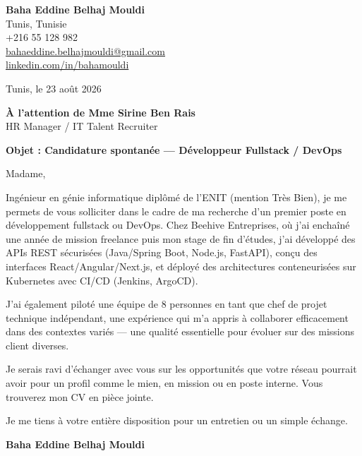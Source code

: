 \documentclass[a4paper,11pt]{article}
\begin{document}
\begin{flushright}
{\bfseries Baha Eddine Belhaj Mouldi}\\
Tunis, Tunisie\\
+216 55 128 982\\
\href{mailto:bahaeddine.belhajmouldi@gmail.com}{bahaeddine.belhajmouldi@gmail.com}\\
\href{https://linkedin.com/in/bahamouldi}{linkedin.com/in/bahamouldi}
\end{flushright}
\vspace{0.8cm}
\begin{flushleft}
Tunis, le 23 ao\^ut 2026
\vspace{0.8cm}

{\bfseries \`A l'attention de Mme Sirine Ben Rais}\\
HR Manager / IT Talent Recruiter
\vspace{0.6cm}

{\bfseries Objet : Candidature spontan\'ee --- D\'eveloppeur Fullstack / DevOps}
\end{flushleft}
\vspace{0.6cm}
Madame,

Ing\'enieur en g\'enie informatique dipl\^om\'e de l'ENIT (mention Tr\`es Bien), je me permets de vous solliciter dans le cadre de ma recherche d'un premier poste en d\'eveloppement fullstack ou DevOps. Chez Beehive Entreprises, o\`u j'ai encha\^in\'e une ann\'ee de mission freelance puis mon stage de fin d'\'etudes, j'ai d\'evelopp\'e des APIs REST s\'ecuris\'ees (Java/Spring Boot, Node.js, FastAPI), con\c cu des interfaces React/Angular/Next.js, et d\'eploy\'e des architectures conteneuris\'ees sur Kubernetes avec CI/CD (Jenkins, ArgoCD).

J'ai \'egalement pilot\'e une \'equipe de 8 personnes en tant que chef de projet technique ind\'ependant, une exp\'erience qui m'a appris \`a collaborer efficacement dans des contextes vari\'es --- une qualit\'e essentielle pour \'evoluer sur des missions client diverses.

Je serais ravi d'\'echanger avec vous sur les opportunit\'es que votre r\'eseau pourrait avoir pour un profil comme le mien, en mission ou en poste interne. Vous trouverez mon CV en pi\`ece jointe.

Je me tiens \`a votre enti\`ere disposition pour un entretien ou un simple \'echange.

\vspace{0.8cm}
\begin{flushright}
{\bfseries Baha Eddine Belhaj Mouldi}
\end{flushright}
\end{document}
